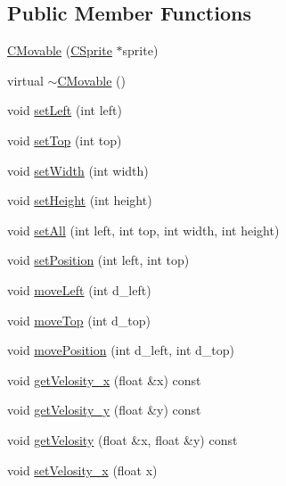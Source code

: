 \subsection*{Public Member Functions}
\begin{DoxyCompactItemize}
\item 
\hyperlink{classengine_1_1CMovable_af28d9429a4bf12fc37fb807bb0ae9c05}{C\-Movable} (\hyperlink{classCSprite}{C\-Sprite} $\ast$sprite)
\item 
virtual \hyperlink{classengine_1_1CMovable_a2a8adce4d82128afdde96d0c9eb724b7}{$\sim$\-C\-Movable} ()
\item 
void \hyperlink{classengine_1_1CMovable_aa4b25f57e8b5613035463f28eaa4fc36}{set\-Left} (int left)
\item 
void \hyperlink{classengine_1_1CMovable_a680ee306f10a10a79616e3483300edb0}{set\-Top} (int top)
\item 
void \hyperlink{classengine_1_1CMovable_af8a646f2cebafb3f1cec4934132e3128}{set\-Width} (int width)
\item 
void \hyperlink{classengine_1_1CMovable_a6e78d43b1968931da9c91e4657502025}{set\-Height} (int height)
\item 
void \hyperlink{classengine_1_1CMovable_a98ef52dedd948dc2cc6fd5cad92444c0}{set\-All} (int left, int top, int width, int height)
\item 
void \hyperlink{classengine_1_1CMovable_ad6342adfc04b24120e5b19cf77fe44f5}{set\-Position} (int left, int top)
\item 
void \hyperlink{classengine_1_1CMovable_aba30b69bd14b16076f3d11c7b0471b83}{move\-Left} (int d\-\_\-left)
\item 
void \hyperlink{classengine_1_1CMovable_ad8f9971aa2d8c6a056d9ca04a2aba195}{move\-Top} (int d\-\_\-top)
\item 
void \hyperlink{classengine_1_1CMovable_a680b7faa861881cca82952f01d0fb20e}{move\-Position} (int d\-\_\-left, int d\-\_\-top)
\item 
void \hyperlink{classengine_1_1CMovable_aa9c441a7c6ea04959db6968f78dd9158}{get\-Velosity\-\_\-x} (float \&x) const 
\item 
void \hyperlink{classengine_1_1CMovable_a082d0f378616726256e96724c3009493}{get\-Velosity\-\_\-y} (float \&y) const 
\item 
void \hyperlink{classengine_1_1CMovable_a7fa5504cad44efed5da9cc2298bed93b}{get\-Velosity} (float \&x, float \&y) const 
\item 
void \hyperlink{classengine_1_1CMovable_a9f1674b45a63529f2cf1bcbfd65c1a28}{set\-Velosity\-\_\-x} (float x)

\end{DoxyCompactItemize}
